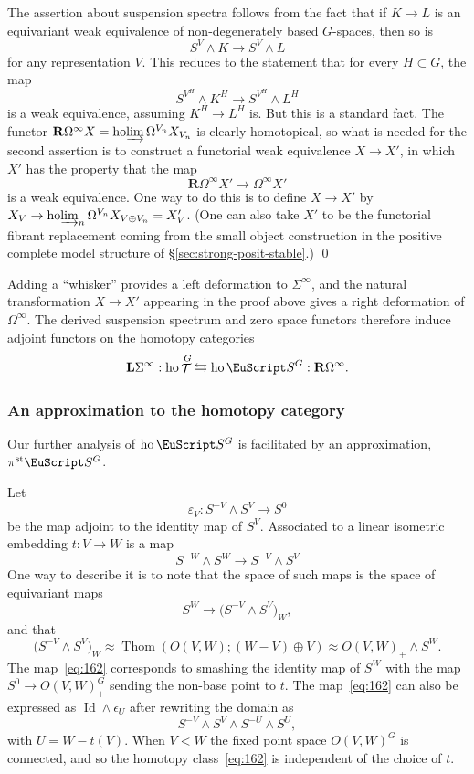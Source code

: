 \documentclass{amsart}
\theoremstyle{definition}
\theoremstyle{remark}
\newenvironment{pf}{\bigskip{\em Proof:\/}}{\qed\medskip}
\newcommand{\spectra}{\EuScript S}
\DeclareMathOperator{\ho}{ho}
\DeclareMathOperator{\spaces}{\mathcal T}
\DeclareMathOperator{\thom}{Thom}
\newcommand{\ugspaces}[1]{\spaces^{#1}}
\newcommand{\ugspectra}[1]{\spectra^{#1}}
\newcommand{\hocolim}{\ho\!\varinjlim}
\newcommand{\lder}{\mathbf{L}}
\newcommand{\rder}{\mathbf{R}}
\newcommand{\pist}{\pi^{\text{st}}}
\DeclareMathOperator{\id}{Id}
\begin{document}
\begin{pf}
The assertion about suspension spectra follows from the fact that if
$K\to L$ is an equivariant weak equivalence of non-degenerately based
$G$-spaces, then so is
\[
S^{V}\wedge K\to S^{V}\wedge L
\] 
for any representation $V$.  This reduces to the statement that for
every $H\subset G$, the map
\[
S^{V^{H}}\wedge K^{H}\to
S^{V^{H}}\wedge L^{H}
\]
is a weak equivalence, assuming $K^{H}\to L^{H}$ is.  But this is a
standard fact.  The functor $\rder\Omega^{\infty}X = \hocolim
\Omega^{V_{n}}X_{V_{n}}$ is clearly homotopical, so what is needed for
the second assertion is to construct a functorial weak equivalence
$X\to X'$, in which $X'$ has the property that the map
\[
\rder \Omega^{\infty}X' \to \Omega^{\infty}X' 
\]
is a weak equivalence.  One way to do this is to define $X\to X'$ by
$X_{V}\to \hocolim_{n}\Omega^{V_{n}}X_{V\oplus V_{n}} = X'_{V}$.
(One can also take $X'$ to be the functorial fibrant replacement coming
from the small object construction in the positive complete
model structure of \S\ref{sec:strong-posit-stable}.)
\end{pf}

Adding a ``whisker'' provides a left deformation to $\Sigma^{\infty}$,
and the natural transformation $X\to X'$ appearing in the proof above
gives a right deformation of $\Omega^{\infty}$.  The derived
suspension spectrum and zero space functors therefore induce adjoint
functors on the homotopy categories
\[
\lder\Sigma^{\infty}:\ho\ugspaces{G} \leftrightarrows
\ho\ugspectra{G}:\rder\Omega^{\infty}.
\]

\subsubsection{An approximation to the homotopy category}
\label{sec-copied:relat-span-whit} 

Our further analysis of $\ho\ugspectra{G}$ is facilitated by an
approximation, $\pist\ugspectra{G}$.

Let
\begin{equation}
\label{eq-copied:166}
\varepsilon_{V}:S^{-V}\wedge S^{V}\to S^{0}
\end{equation}
be the map adjoint to the identity map of $S^{V}$.  Associated to a
linear isometric embedding $t:V\to W$ is a map
\begin{equation}
\label{eq:162}
S^{-W}\wedge S^{W} \to S^{-V}\wedge S^{V}
\end{equation}
One way to describe it is to note that the space of such maps is the
space of equivariant maps
\[
S^{W}\to \big(S^{-V}\wedge S^{V})_{W},
\]
and that
\[
\big(S^{-V}\wedge S^{V})_{W} \approx \thom(O(V,W);(W-V)\oplus V)
\approx O(V,W)_{+}\wedge S^{W}.
\]
The map~\eqref{eq:162} corresponds to smashing the identity map of
$S^{W}$ with the map $S^{0}\to O(V,W)^{G}_{+}$ sending the non-base
point to $t$.  The map~\eqref{eq:162} can also be expressed as
$\id\wedge \epsilon_{U}$ after 
rewriting the domain as
\[
S^{-V}\wedge S^{V}\wedge S^{-U}\wedge S^{U},
\]
with $U=W-t(V)$.  When $V<W$ the fixed point space $O(V,W)^{G}$ is
connected, and so the homotopy class~\eqref{eq:162} is independent of
the choice of $t$.
\end{document}
